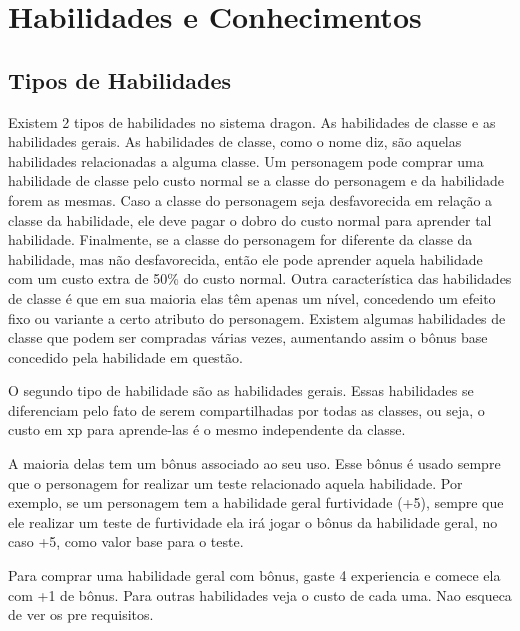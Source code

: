 
\chapter{Habilidades e Conhecimentos}
\label{Cap:Habilidades}

\section{Tipos de Habilidades}

Existem 2 tipos de habilidades no sistema dragon. As habilidades de classe e as habilidades gerais. As habilidades de classe, como o nome diz, são aquelas habilidades relacionadas a alguma classe. Um personagem pode comprar uma habilidade de classe pelo custo normal se a classe do personagem e da habilidade forem as mesmas. Caso a classe do personagem seja desfavorecida em relação a classe da habilidade, ele deve pagar o dobro do custo normal para aprender tal habilidade. Finalmente, se a classe do personagem for diferente da classe da habilidade, mas não desfavorecida, então ele pode aprender aquela habilidade com um custo extra de 50\% do custo normal. Outra característica das habilidades de classe é que em sua maioria elas têm apenas um nível, concedendo um efeito fixo ou variante a certo atributo do personagem. Existem algumas habilidades de classe que podem ser compradas várias vezes, aumentando assim o bônus base concedido pela habilidade em questão.

O segundo tipo de habilidade são as habilidades gerais. Essas habilidades se diferenciam pelo fato de serem compartilhadas por todas as classes, ou seja, o custo em xp para aprende-las é o mesmo independente da classe. 

A maioria delas tem um bônus associado ao seu uso. Esse bônus é usado sempre que o personagem for realizar um teste relacionado aquela habilidade. Por exemplo, se um personagem tem a habilidade geral furtividade (+5), sempre que ele realizar um teste de furtividade ela irá jogar o bônus da habilidade geral, no caso +5, como valor base para o teste. 

Para comprar uma habilidade geral com bônus, gaste 4 experiencia e comece ela com +1 de bônus. Para outras habilidades veja o custo de cada uma. Nao esqueca de ver os pre requisitos.



